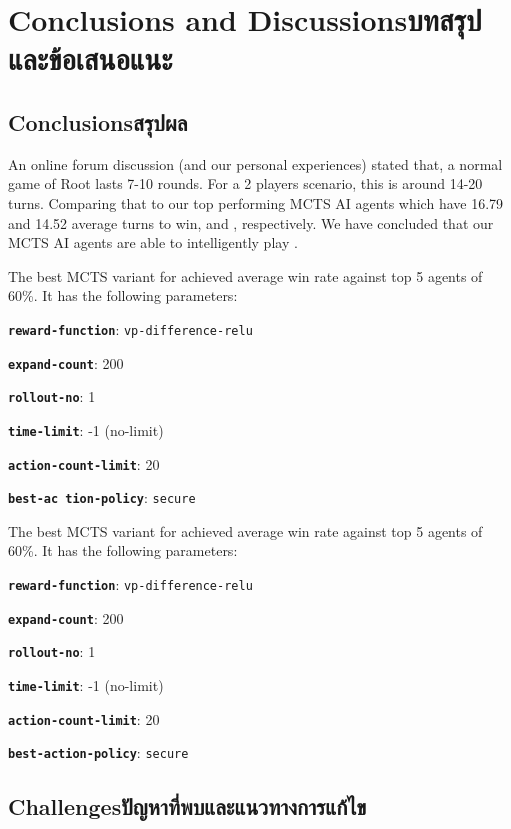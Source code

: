 \chapter{\ifenglish Conclusions and Discussions\else บทสรุปและข้อเสนอแนะ\fi}

\section{\ifenglish Conclusions\else สรุปผล\fi}

An online forum discussion (and our personal experiences) stated that, a normal game of Root lasts 7-10 rounds. For a 2 players scenario, this is around 14-20 turns. Comparing that to our top performing MCTS AI agents which have 16.79 and 14.52 average turns to win, \Marquise{} and \Eyrie{}, respectively. We have concluded that our MCTS AI agents are able to intelligently play \RootB{}.

The best MCTS variant for \Marquise{} achieved average win rate against top 5 \Eyrie{} agents of 60\%. It has the following parameters:
\item \textbf{\texttt{reward-function}}: \texttt{vp-difference-relu}
\item \textbf{\texttt{expand-count}}: 200
\item \textbf{\texttt{rollout-no}}: 1
\item \textbf{\texttt{time-limit}}: -1 (no-limit)
\item \textbf{\texttt{action-count-limit}}: 20
\item \textbf{\texttt{best-ac   tion-policy}}: \texttt{secure}

The best MCTS variant for \Eyrie{} achieved average win rate against top 5 \Marquise{} agents of 60\%. It has the following parameters:
\item \textbf{\texttt{reward-function}}: \texttt{vp-difference-relu}
\item \textbf{\texttt{expand-count}}: 200
\item \textbf{\texttt{rollout-no}}: 1
\item \textbf{\texttt{time-limit}}: -1 (no-limit)
\item \textbf{\texttt{action-count-limit}}: 20
\item \textbf{\texttt{best-action-policy}}: \texttt{secure}

\section{\ifenglish Challenges\else ปัญหาที่พบและแนวทางการแก้ไข\fi}

